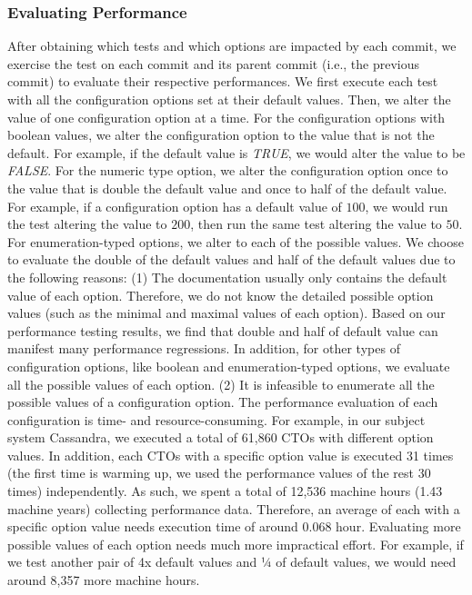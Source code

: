 \subsubsection{Evaluating Performance}
\label{evaluation}
After obtaining which tests and which options are impacted by each commit, we exercise the test on each commit and its parent commit (i.e., the previous commit) to evaluate their respective performances. %
We first execute each test with all the configuration options set at their default values. Then, we alter the value of one configuration option at a time. For the configuration options with boolean values, we alter the configuration option to the value that is not the default. For example, if the default value is \emph{TRUE}, we would alter the value to be \emph{FALSE}. For the numeric type option, we alter the configuration option once to the value that is double the default value and once to half of the default value. For example, if a configuration option has a default value of $100$, we would run the test altering the value to $200$, then run the same test altering the value to $50$. %
For enumeration-typed options, we alter to each of the possible values.%
We choose to evaluate the double of the default values and half of the default values due to the following reasons: 
(1) The documentation usually only contains the default value of each option. Therefore, we do not know the detailed possible option values (such as the minimal and maximal values of each option). Based on our performance testing results, we find that double and half of default value can manifest many performance regressions. In addition, for other types of configuration options, like boolean and enumeration-typed options, we evaluate all the possible values of each option.
(2) It is infeasible to enumerate all the possible values of a configuration option. The performance evaluation of each configuration is time- and resource-consuming. For example, in our subject system Cassandra, we executed a total of 61,860 CTOs with different option values. In addition, each CTOs with a specific option value is executed 31 times (the first time is warming up, we used the performance values of the rest 30 times) independently. As such, we spent a total of 12,536 machine hours (1.43 machine years) collecting performance data. Therefore, an average of each \instance with a specific option value needs execution time of around 0.068 hour. Evaluating more possible values of each option needs much more impractical effort. For example, if we test another pair of 4x default values and ¼ of default values, we would need around 8,357 more machine hours. 

